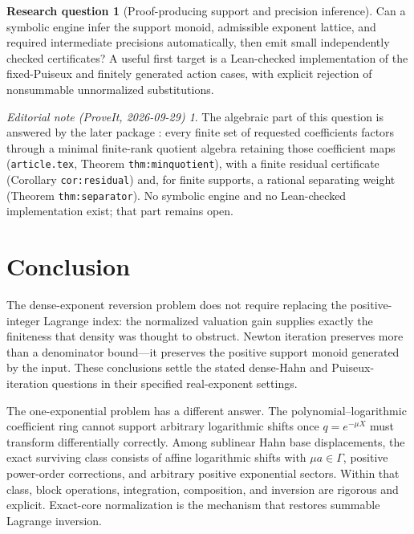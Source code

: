 \documentclass[11pt,a4paper]{article}
\theoremstyle{definition}
\newtheorem{question}[theorem]{Research question}
\theoremstyle{remark}
\newtheorem*{ednote}{Editorial note (ProveIt, 2026-09-29)}
\begin{document}
\begin{question}[Proof-producing support and precision inference]
Can a symbolic engine infer the support monoid, admissible exponent lattice,
and required intermediate precisions automatically, then emit small
independently checked certificates? A useful first target is a Lean-checked
implementation of the fixed-Puiseux and finitely generated action cases,
with explicit rejection of nonsummable unnormalized substitutions.
\end{question}
\begin{ednote}\label{ed:certificates}
The algebraic part of this question is answered by the later package
:
every finite set of requested coefficients factors through a minimal
finite-rank quotient algebra retaining those coefficient maps
(\texttt{article.tex}, Theorem \texttt{thm:minquotient}), with a finite
residual certificate (Corollary \texttt{cor:residual}) and, for finite
supports, a rational separating weight (Theorem \texttt{thm:separator}).
No symbolic engine and no Lean-checked implementation exist; that part
remains open.
\end{ednote}

\section{Conclusion}
The dense-exponent reversion problem does not require replacing the
positive-integer Lagrange index: the normalized valuation gain supplies
exactly the finiteness that density was thought to obstruct. Newton
iteration preserves more than a denominator bound---it preserves the
positive support monoid generated by the input. These conclusions settle
the stated dense-Hahn and Puiseux-iteration questions in their specified
real-exponent settings.

The one-exponential problem has a different answer. The polynomial--logarithmic
coefficient ring cannot support arbitrary logarithmic shifts once
$q=e^{-\mu X}$ must transform differentially correctly. Among sublinear Hahn base displacements, the exact surviving
class consists of affine logarithmic shifts with $\mu a\in\Gamma$, positive
power-order corrections, and arbitrary positive exponential sectors.
Within that class, block operations, integration, composition, and inversion
are rigorous and explicit. Exact-core normalization is the mechanism that
restores summable Lagrange inversion.
\end{document}
